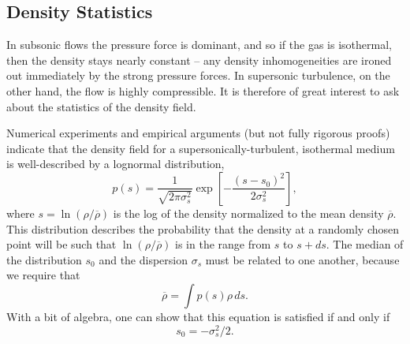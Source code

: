 \subsection{Density Statistics}

In subsonic flows the pressure force is dominant, and so if the gas is isothermal, then the density stays nearly constant -- any density inhomogeneities are ironed out immediately by the strong pressure forces. In supersonic turbulence, on the other hand, the flow is highly compressible. It is therefore of great interest to ask about the statistics of the density field.

Numerical experiments and empirical arguments (but not fully rigorous proofs) indicate that the density field for a supersonically-turbulent, isothermal medium is well-described by a lognormal distribution,
\begin{equation}
p(s) = \frac{1}{\sqrt{2\pi \sigma_s^2}} \exp\left[-\frac{(s-s_0)^2}{2\sigma_s^2}\right],
\end{equation}
where $s=\ln(\rho/\overline{\rho})$ is the log of the density normalized to the mean density $\overline{\rho}$. This distribution describes the probability that the density at a randomly chosen point will be such that $\ln(\rho/\overline{\rho})$ is in the range from $s$ to $s+ds$. The median of the distribution $s_0$ and the dispersion $\sigma_s$ must be related to one another, because we require that
\begin{equation}
\overline{\rho} = \int p(s) \rho \, ds.
\end{equation}
With a bit of algebra, one can show that this equation is satisfied if and only if
\begin{equation}
s_0 = -\sigma_s^2/2.
\end{equation}

